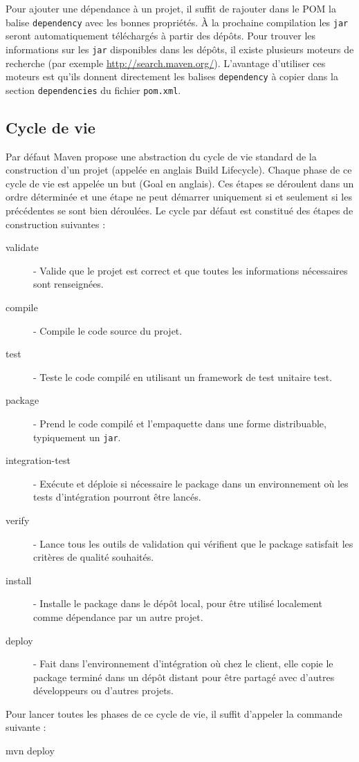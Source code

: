\documentclass[a4paper,11pt]{article}
\begin{document}
Pour ajouter une dépendance à un projet, il suffit de rajouter dans le POM la balise \texttt{dependency} avec les 
bonnes propriétés. À la prochaine compilation les \texttt{jar} seront automatiquement téléchargés à partir des dépôts.
Pour trouver les informations sur les \texttt{jar} disponibles dans les dépôts, il existe plusieurs moteurs de recherche 
(par exemple \url{http://search.maven.org/}). L'avantage d'utiliser ces moteurs est qu'ils donnent directement les 
balises \texttt{dependency} à copier dans la section \texttt{dependencies} du fichier \texttt{pom.xml}.

\subsection{Cycle de vie}
Par défaut Maven propose une abstraction du cycle de vie standard de la construction d'un projet (appelée en anglais Build Lifecycle). 
Chaque phase de ce cycle de vie est appelée un but (Goal en anglais). Ces étapes se déroulent dans un ordre déterminée et 
une étape ne peut démarrer uniquement si et seulement si les précédentes se sont bien déroulées. Le cycle par défaut est constitué 
des étapes de construction suivantes :
\begin{description}
  \item[validate] - Valide que le projet est correct et que toutes les informations nécessaires sont renseignées.
  \item[compile] - Compile le code source du projet.
  \item[test] - Teste le code compilé en utilisant un framework de test unitaire test.
  \item[package] - Prend le code compilé et l'empaquette dans une forme distribuable, typiquement un \texttt{jar}.
  \item[integration-test] - Exécute et déploie si nécessaire le package dans un environnement où les tests d'intégration pourront être lancés.
  \item[verify] - Lance tous les outils de validation qui  vérifient que le package satisfait les critères de qualité souhaités.
  \item[install] - Installe le package dans le dépôt local, pour être utilisé localement comme dépendance par un autre projet.
  \item[deploy] - Fait dans l'environnement d'intégration où chez le client, elle copie le package terminé dans un dépôt distant 
  pour être partagé avec d'autres développeurs ou d'autres projets.
\end{description}
Pour lancer toutes les phases de ce cycle de vie, il suffit d'appeler la commande suivante : 
\begin{code_shell}
mvn deploy
\end{code_shell}
\end{document}
